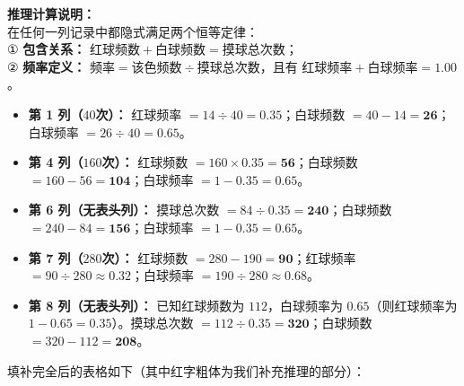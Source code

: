 \documentclass[12pt, a4paper]{ctexrep}
\begin{document}
\vspace{0.2cm}
\textbf{推理计算说明：}\\
在任何一列记录中都隐式满足两个恒等定律：\\
① \textbf{包含关系：} $\text{红球频数} + \text{白球频数} = \text{摸球总次数}$；\\
② \textbf{频率定义：} $\text{频率} = \text{该色频数} \div \text{摸球总次数}$，且有 $\text{红球频率} + \text{白球频率} = 1.00$。
\begin{itemize}
  \item \textbf{第 1 列（$40$次）：} 红球频率 $= 14 \div 40 = \boldsymbol{0.35}$；白球频数 $= 40 - 14 = \boldsymbol{26}$；白球频率 $= 26 \div 40 = \boldsymbol{0.65}$。
  \item \textbf{第 4 列（$160$次）：} 红球频数 $= 160 \times 0.35 = \boldsymbol{56}$；白球频数 $= 160 - 56 = \boldsymbol{104}$；白球频率 $= 1 - 0.35 = \boldsymbol{0.65}$。
  \item \textbf{第 6 列（无表头列）：} 摸球总次数 $= 84 \div 0.35 = \boldsymbol{240}$；白球频数 $= 240 - 84 = \boldsymbol{156}$；白球频率 $= 1 - 0.35 = \boldsymbol{0.65}$。
  \item \textbf{第 7 列（$280$次）：} 红球频数 $= 280 - 190 = \boldsymbol{90}$；红球频率 $= 90 \div 280 \approx \boldsymbol{0.32}$；白球频率 $= 190 \div 280 \approx \boldsymbol{0.68}$。
  \item \textbf{第 8 列（无表头列）：} 已知红球频数为 $112$，白球频率为 $0.65$（则红球频率为 $1 - 0.65 = \boldsymbol{0.35}$）。摸球总次数 $= 112 \div 0.35 = \boldsymbol{320}$；白球频数 $= 320 - 112 = \boldsymbol{208}$。
\end{itemize}

填补完全后的表格如下（其中红字粗体为我们补充推理的部分）：
\end{document}
